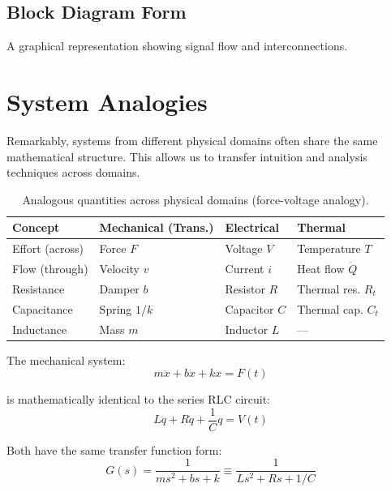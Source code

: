 \section{Block Diagram Form}

A graphical representation showing signal flow and interconnections.



\chapter{System Analogies}
\label{ch:analogies}

Remarkably, systems from different physical domains often share the same mathematical structure. This allows us to transfer intuition and analysis techniques across domains.

\begin{table}[htbp]
\centering
\begin{tabular}{llll}
\toprule
\textbf{Concept} & \textbf{Mechanical (Trans.)} & \textbf{Electrical} & \textbf{Thermal} \\
\midrule
Effort (across) & Force $F$ & Voltage $V$ & Temperature $T$ \\
Flow (through) & Velocity $v$ & Current $i$ & Heat flow $\dot{Q}$ \\
Resistance & Damper $b$ & Resistor $R$ & Thermal res. $R_t$ \\
Capacitance & Spring $1/k$ & Capacitor $C$ & Thermal cap. $C_t$ \\
Inductance & Mass $m$ & Inductor $L$ & --- \\
\bottomrule
\end{tabular}
\caption{Analogous quantities across physical domains (force-voltage analogy).}
\label{tab:analogies}
\end{table}

\begin{examplebox}[title=Example 1.1: Mass-Spring-Damper $\equiv$ RLC Circuit]
The mechanical system:
\begin{equation}
m\ddot{x} + b\dot{x} + kx = F(t)
\end{equation}

is mathematically identical to the series RLC circuit:
\begin{equation}
L\ddot{q} + R\dot{q} + \frac{1}{C}q = V(t)
\end{equation}

Both have the same transfer function form:
\begin{equation}
G(s) = \frac{1}{ms^2 + bs + k} \equiv \frac{1}{Ls^2 + Rs + 1/C}
\end{equation}
\end{examplebox}

